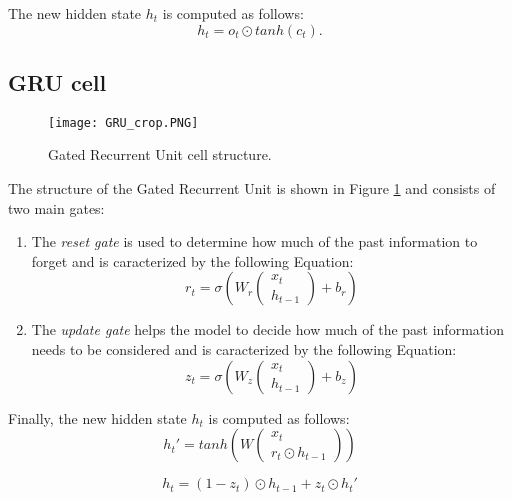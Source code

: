 The new hidden state $h_t$ is computed as follows:
\begin{equation}
    h_t = o_t \odot tanh(c_t) .
\end{equation}






\subsection{GRU cell}

\begin{figure}[htbp]
\centerline{\texttt{[image: GRU\_crop.PNG]}}
\caption{Gated Recurrent Unit cell structure.} %
\label{fig:gru}
\end{figure}

The structure of the Gated Recurrent Unit is shown in Figure \ref{fig:gru} 
and consists of two main gates:

\begin{enumerate}
    \item The \textit{reset gate} is used to determine how much of the past 
    information to forget and is caracterized by the following Equation:
        \begin{equation}
            r_t = \sigma \left(
                W_r
                \begin{pmatrix}
                x_t \\
                h_{t-1}
                \end{pmatrix}
                + b_r
            \right)
        \end{equation}
    
    \item The \textit{update gate} helps the model to decide how much of the past 
    information needs to be considered and is caracterized by the following Equation:
        \begin{equation}
            z_t = \sigma \left(
                W_z
                \begin{pmatrix}
                x_t \\
                h_{t-1}
                \end{pmatrix}
                + b_z
            \right)
        \end{equation}

\end{enumerate}

Finally, the new hidden state $h_t$ is computed as follows:
\begin{equation}
    h_t' = tanh \left( W
        \begin{pmatrix}
            x_t \\
            r_t \odot h_{t-1}
        \end{pmatrix}
        \right)
\end{equation}

\begin{equation}
    h_t = (1-z_t) \odot h_{t-1} + z_t \odot h_t'
\end{equation}

